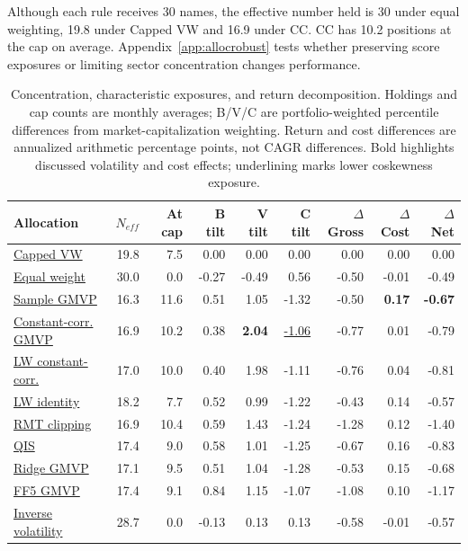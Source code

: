 \documentclass[letterpaper,journal]{IEEEtran}
\begin{document}
Although each rule receives 30 names, the effective number held is 30 under equal weighting, 19.8 under Capped VW and 16.9 under CC. CC has 10.2 positions at the cap on average. Appendix~\ref{app:allocrobust} tests whether preserving score exposures or limiting sector concentration changes performance.

\begin{table}[!tp]\centering
\caption{Concentration, characteristic exposures, and return decomposition. Holdings and cap counts are monthly averages; B/V/C are portfolio-weighted percentile differences from market-capitalization weighting. Return and cost differences are annualized arithmetic percentage points, not CAGR differences. Bold highlights discussed volatility and cost effects; underlining marks lower coskewness exposure.}\label{tab:mechanism}
\scriptsize\begin{tabular}{lrrrrrrrr}\toprule
Allocation & $N_{eff}$ & At cap & B tilt & V tilt & C tilt & $\Delta$Gross & $\Delta$Cost & $\Delta$Net\\\midrule
\hyperref[alloc:source_weight]{Capped VW} & 19.8 & 7.5 & 0.00 & 0.00 & 0.00 & 0.00 & 0.00 & 0.00 \\
\hyperref[alloc:equal_weight]{Equal weight} & 30.0 & 0.0 & -0.27 & -0.49 & 0.56 & -0.50 & -0.01 & -0.49 \\
\hyperref[alloc:gmvp_sample]{Sample GMVP} & 16.3 & 11.6 & 0.51 & 1.05 & -1.32 & -0.50 & \textbf{0.17} & \textbf{-0.67} \\
\hyperref[alloc:gmvp_constant_corr]{Constant-corr. GMVP} & 16.9 & 10.2 & 0.38 & \textbf{2.04} & \underline{-1.06} & -0.77 & 0.01 & -0.79 \\
\hyperref[alloc:gmvp_lw_constant_corr]{LW constant-corr.} & 17.0 & 10.0 & 0.40 & 1.98 & -1.11 & -0.76 & 0.04 & -0.81 \\
\hyperref[alloc:gmvp_lw_identity]{LW identity} & 18.2 & 7.7 & 0.52 & 0.99 & -1.22 & -0.43 & 0.14 & -0.57 \\
\hyperref[alloc:gmvp_rmt_clipping]{RMT clipping} & 16.9 & 10.4 & 0.59 & 1.43 & -1.24 & -1.28 & 0.12 & -1.40 \\
\hyperref[alloc:gmvp_qis]{QIS} & 17.4 & 9.0 & 0.58 & 1.01 & -1.25 & -0.67 & 0.16 & -0.83 \\
\hyperref[alloc:gmvp_ridge]{Ridge GMVP} & 17.1 & 9.5 & 0.51 & 1.04 & -1.28 & -0.53 & 0.15 & -0.68 \\
\hyperref[alloc:gmvp_factor]{FF5 GMVP} & 17.4 & 9.1 & 0.84 & 1.15 & -1.07 & -1.08 & 0.10 & -1.17 \\
\hyperref[alloc:inverse_vol]{Inverse volatility} & 28.7 & 0.0 & -0.13 & 0.13 & 0.13 & -0.58 & -0.01 & -0.57 \\

\end{tabular}
\end{table}
\end{document}
